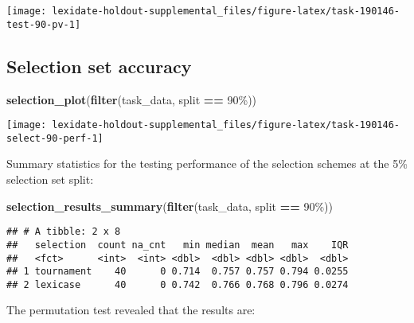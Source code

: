 \documentclass[
]{book}
\newenvironment{Shaded}{\begin{snugshade}}{\end{snugshade}}
\newcommand{\FunctionTok}[1]{\textcolor[rgb]{0.13,0.29,0.53}{\textbf{#1}}}
\newcommand{\NormalTok}[1]{#1}
\newcommand{\SpecialCharTok}[1]{\textcolor[rgb]{0.81,0.36,0.00}{\textbf{#1}}}
\newcommand{\StringTok}[1]{\textcolor[rgb]{0.31,0.60,0.02}{#1}}
\begin{document}
\texttt{[image: lexidate-holdout-supplemental\_files/figure-latex/task-190146-test-90-pv-1]}

\hypertarget{selection-set-accuracy-18}{%
\subsection{Selection set accuracy}\label{selection-set-accuracy-18}}

\begin{Shaded}
\begin{Highlighting}[]
\FunctionTok{selection\_plot}\NormalTok{(}\FunctionTok{filter}\NormalTok{(task\_data, split }\SpecialCharTok{==} \StringTok{\textquotesingle{}90\%\textquotesingle{}}\NormalTok{))}
\end{Highlighting}
\end{Shaded}

\texttt{[image: lexidate-holdout-supplemental\_files/figure-latex/task-190146-select-90-perf-1]}

Summary statistics for the testing performance of the selection schemes at the 5\% selection set split:

\begin{Shaded}
\begin{Highlighting}[]
\FunctionTok{selection\_results\_summary}\NormalTok{(}\FunctionTok{filter}\NormalTok{(task\_data, split }\SpecialCharTok{==} \StringTok{\textquotesingle{}90\%\textquotesingle{}}\NormalTok{))}
\end{Highlighting}
\end{Shaded}

\begin{verbatim}
## # A tibble: 2 x 8
##   selection  count na_cnt   min median  mean   max    IQR
##   <fct>      <int>  <int> <dbl>  <dbl> <dbl> <dbl>  <dbl>
## 1 tournament    40      0 0.714  0.757 0.757 0.794 0.0255
## 2 lexicase      40      0 0.742  0.766 0.768 0.796 0.0274
\end{verbatim}

The permutation test revealed that the results are:
\end{document}
